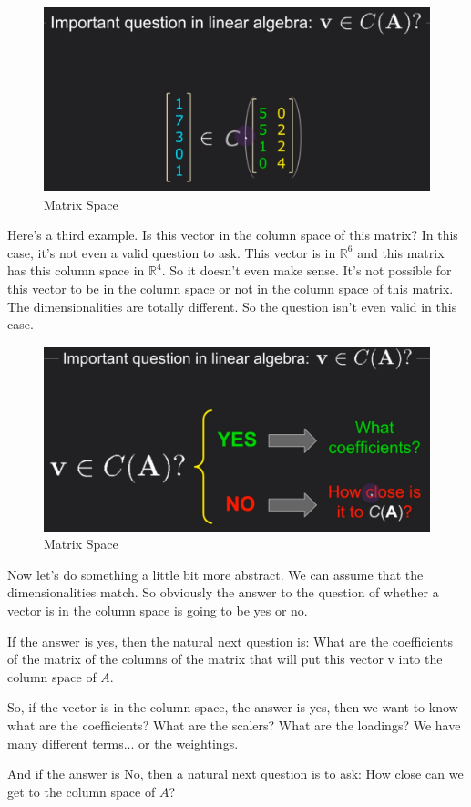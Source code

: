 \documentclass[fleqn,10pt]{olplainarticle}
\theoremstyle{definition}
\theoremstyle{remark}
\begin{document}
\begin{figure}[ht]
	\centering
	\includegraphics[width=0.5\linewidth]{images/matrix-space-06.png}
	\caption{Matrix Space}
	\label{fig:matrix_space_06}
\end{figure}

Here's a third example. Is this vector in the column space of this matrix? In this case, it's not even a valid question to ask. This vector is in $\mathbb{R}^6$ and this matrix has this column space in $\mathbb{R}^4$. So it doesn't even make sense. It's not possible for this vector to be in the column space or not in the column space of this matrix. The dimensionalities are totally different. So the question isn't even valid in this case.

\begin{figure}[ht]
	\centering
	\includegraphics[width=0.5\linewidth]{images/matrix-space-07.png}
	\caption{Matrix Space}
	\label{fig:matrix_space_07}
\end{figure}

Now let's do something a little bit more abstract. We can assume that the dimensionalities match. So obviously the answer to the question of whether a vector is in the column space is going to be yes or no.

If the answer is yes, then the natural next question is: What are the coefficients of the matrix of the columns of the matrix that will put this vector v into the column space of $A$.

So, if the vector is in the column space, the answer is yes, then we want to know what are the coefficients? What are the scalers? What are the loadings? We have many different terms... or the weightings.

And if the answer is No, then a natural next question is to ask: How close can we get to the column space of $A$?
\end{document}
